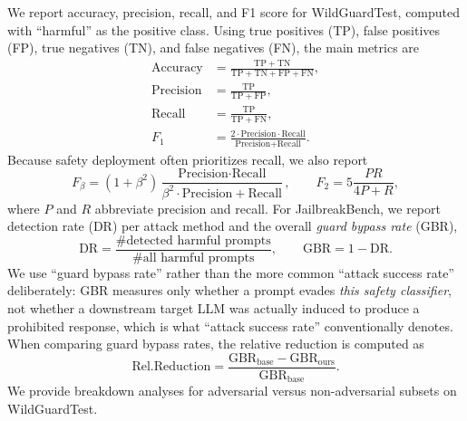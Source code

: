 \documentclass[superintelligence,article,accept,moreauthors]{Definitions/mdpi}
\begin{document}
We report accuracy, precision, recall, and F1 score for WildGuardTest, computed with ``harmful'' as the positive class. Using true positives (TP), false positives (FP), true negatives (TN), and false negatives (FN), the main metrics are
\begin{align}
  \text{Accuracy} &= \frac{\mathrm{TP}+\mathrm{TN}}{\mathrm{TP}+\mathrm{TN}+\mathrm{FP}+\mathrm{FN}}, \\
  \text{Precision} &= \frac{\mathrm{TP}}{\mathrm{TP}+\mathrm{FP}}, \\
  \text{Recall} &= \frac{\mathrm{TP}}{\mathrm{TP}+\mathrm{FN}}, \\
  F_{1} &= \frac{2 \cdot \text{Precision} \cdot \text{Recall}}{\text{Precision}+\text{Recall}}.
\end{align}
Because safety deployment often prioritizes recall, we also report
\begin{equation}
  F_{\beta} = (1+\beta^2)\frac{\text{Precision} \cdot \text{Recall}}{\beta^2 \cdot \text{Precision} + \text{Recall}},
  \qquad F_2 = 5\frac{PR}{4P + R},
\end{equation}
where $P$ and $R$ abbreviate precision and recall. For JailbreakBench, we report detection rate (DR) per attack method and the overall \emph{guard bypass rate} (GBR),
\begin{equation}
  \mathrm{DR} = \frac{\#\text{detected harmful prompts}}{\#\text{all harmful prompts}},
  \qquad
  \mathrm{GBR} = 1 - \mathrm{DR}.
\end{equation}
We use ``guard bypass rate'' rather than the more common ``attack success rate'' deliberately: GBR measures only whether a prompt evades \emph{this safety classifier}, not whether a downstream target LLM was actually induced to produce a prohibited response, which is what ``attack success rate'' conventionally denotes. When comparing guard bypass rates, the relative reduction is computed as
\begin{equation}
  \mathrm{Rel.Reduction} = \frac{\mathrm{GBR}_{\text{base}} - \mathrm{GBR}_{\text{ours}}}{\mathrm{GBR}_{\text{base}}}.
\end{equation}
We provide breakdown analyses for adversarial versus non-adversarial subsets on WildGuardTest.
\end{document}
